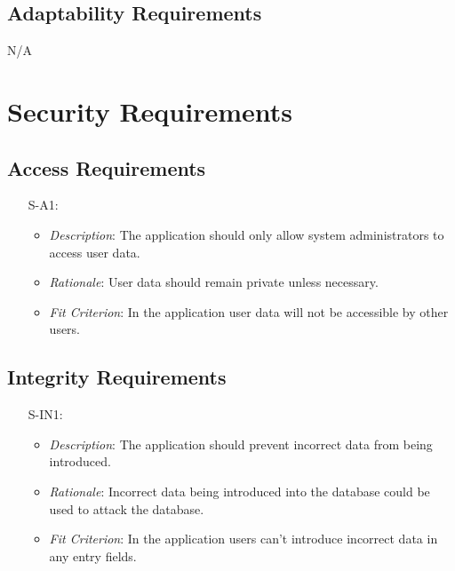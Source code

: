 \documentclass[12pt]{article}
\begin{document}
\subsection{Adaptability Requirements}

N/A


\section{Security Requirements}
\subsection{Access Requirements}
\noindent \begin{itemize}
    \item[S-A1:] 
        \begin{itemize}
           \item \textit{Description}: The application should only allow system administrators to access user data.
            \item \textit{Rationale}: User data should remain private unless necessary.
            \item \textit{Fit Criterion}: In the application user data will not be accessible by other users.
        \end{itemize}
\end{itemize}
\subsection{Integrity Requirements}
\noindent \begin{itemize}
    \item[S-IN1:] 
        \begin{itemize}
           \item \textit{Description}: The application should prevent incorrect data from being introduced.
            \item \textit{Rationale}: Incorrect data being introduced into the database could be used to attack the database.
            \item \textit{Fit Criterion}: In the application users can't introduce incorrect data in any entry fields.
        \end{itemize}
\end{itemize}
\end{document}

